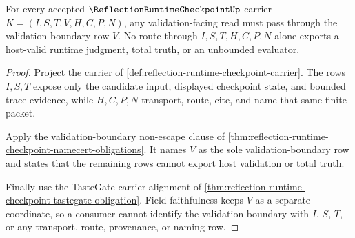\begin{theorem}
\label{thm:reflection-runtime-checkpoint-validation-nonescape-route}
For every accepted $\ReflectionRuntimeCheckpointUp$ carrier $K=(I,S,T,V,H,C,P,N)$, any validation-facing read must pass through the validation-boundary row $V$. No route through $I,S,T,H,C,P,N$ alone exports a host-valid runtime judgment, total truth, or an unbounded evaluator.
\end{theorem}
\begin{proof}
Project the carrier of \autoref{def:reflection-runtime-checkpoint-carrier}. The rows $I,S,T$ expose only the candidate input, displayed checkpoint state, and bounded trace evidence, while $H,C,P,N$ transport, route, cite, and name that same finite packet.

Apply the validation-boundary non-escape clause of \autoref{thm:reflection-runtime-checkpoint-namecert-obligations}. It names $V$ as the sole validation-boundary row and states that the remaining rows cannot export host validation or total truth.

Finally use the TasteGate carrier alignment of \autoref{thm:reflection-runtime-checkpoint-tastegate-obligation}. Field faithfulness keeps $V$ as a separate coordinate, so a consumer cannot identify the validation boundary with $I$, $S$, $T$, or any transport, route, provenance, or naming row.
\end{proof}

